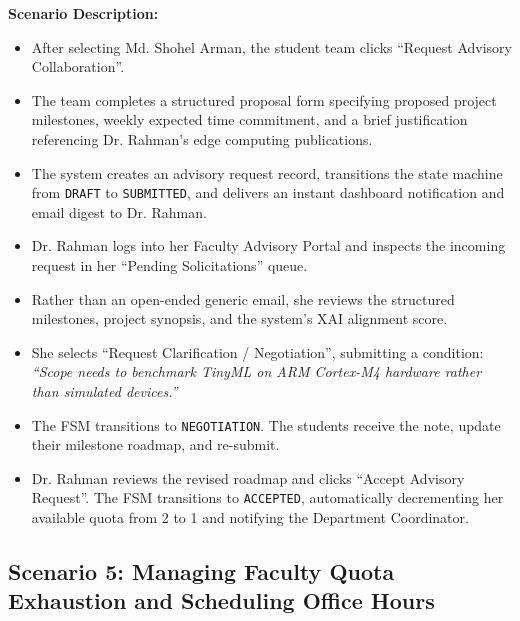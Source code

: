 \noindent\textbf{Scenario Description:}
\begin{itemize}[label=\textbf{\tiny\ensuremath{\blacksquare}}]
    \item After selecting Md. Shohel Arman, the student team clicks ``Request Advisory Collaboration''.
    \item The team completes a structured proposal form specifying proposed project milestones, weekly expected time commitment, and a brief justification referencing Dr. Rahman's edge computing publications.
    \item The system creates an advisory request record, transitions the state machine from \texttt{DRAFT} to \texttt{SUBMITTED}, and delivers an instant dashboard notification and email digest to Dr. Rahman.
    \item Dr. Rahman logs into her Faculty Advisory Portal and inspects the incoming request in her ``Pending Solicitations'' queue.
    \item Rather than an open-ended generic email, she reviews the structured milestones, project synopsis, and the system's XAI alignment score.
    \item She selects ``Request Clarification / Negotiation'', submitting a condition: \textit{``Scope needs to benchmark TinyML on ARM Cortex-M4 hardware rather than simulated devices.''}
    \item The FSM transitions to \texttt{NEGOTIATION}. The students receive the note, update their milestone roadmap, and re-submit.
    \item Dr. Rahman reviews the revised roadmap and clicks ``Accept Advisory Request''. The FSM transitions to \texttt{ACCEPTED}, automatically decrementing her available quota from 2 to 1 and notifying the Department Coordinator.
\end{itemize}

\subsection{Scenario 5: Managing Faculty Quota Exhaustion and Scheduling Office Hours}
\label{subsec:scenario5}

